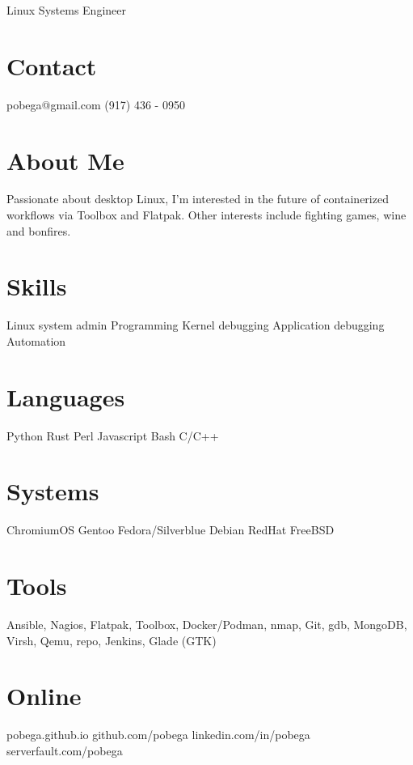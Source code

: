 \documentclass[]{resume}
\begin{document}
\graphicspath{ {images/} }

       {Linux Systems Engineer}


\begin{aside}
  \section{Contact}
    pobega@gmail.com
    (917) 436 - 0950
  \section{About Me}
    Passionate about desktop Linux, I'm interested in the future of containerized workflows via
    Toolbox and Flatpak.\break
    Other interests include
    fighting games, wine and bonfires.
  \section{Skills}
    Linux system admin
    Programming
    Kernel debugging
    Application debugging
    Automation
  \section{Languages}
    Python
    Rust
    Perl
    Javascript
    Bash
    C/C++
  \section{Systems}
    ChromiumOS
    Gentoo
    Fedora/Silverblue
    Debian
    RedHat
    FreeBSD
  \section{Tools}
	Ansible, Nagios, Flatpak, Toolbox, Docker/Podman, nmap, Git, gdb, MongoDB, Virsh, Qemu, repo, Jenkins, Glade (GTK)
  \section{Online}
    {\bodyfontbold pobega}.github.io
    github.com/{\bodyfontbold pobega}
    linkedin.com/in/{\bodyfontbold pobega}
    serverfault.com/{\bodyfontbold pobega}
\end{aside}
\end{document}
